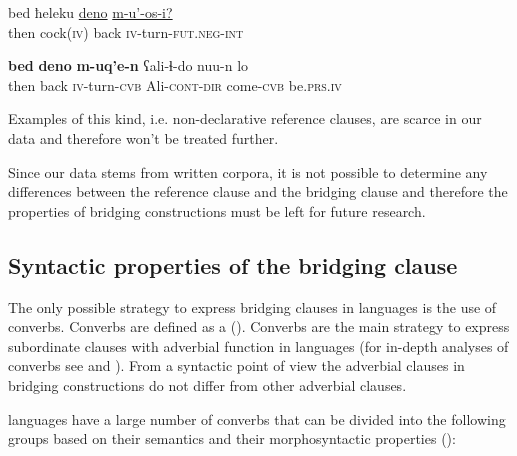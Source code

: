 \documentclass[output=paper]{LSP/langsci}
\begin{document}
\begin{exe}
	\ex	\label{ex:4ab}
	\begin{xlist}
		\ex	\label{ex:4a}
		\gll	 bed	ħeleku	\underline{deno}	\underline{m-u'-os-i?}\\
			then	cock(\textsc{iv})	back	\textsc{iv}-turn-\textsc{fut.neg-int}\\
		\glt	{}

		\ex	\label{ex:4b}
		\gll	\textbf{bed} 	\textbf{deno}		\textbf{m-uq'e-n}		ʕali-ɬ-do			nuu-n			lo\\
			then	back		\textsc{iv}-turn-\textsc{cvb}	Ali-\textsc{cont-dir}	come-\textsc{cvb}	be.\textsc{prs.iv}\\
		\glt	{}
	\end{xlist}
\end{exe}

Examples of this kind, i.e. non-declarative reference clauses, are scarce in our data and therefore won't be treated further. 

Since our data stems from written corpora, it is not possible to determine any  differences between the reference clause and the bridging clause and therefore the  properties of  bridging constructions must be left for future research.


\subsection{Syntactic properties of the bridging clause}
\label{ssec:Syntactic properties of the bridging clause}
The only possible strategy to express bridging clauses in  languages is the use of converbs. Converbs are defined as a  (\citealt[3]{Haspelmath.1995}). Converbs are the main strategy to express subordinate clauses with adverbial function in  languages (for in-depth analyses of converbs see \citealt{Comrie.Forker.Khalilova.2012} and \citealt{Forker.2013b}). From a syntactic point of view the adverbial clauses in bridging constructions do not differ from other adverbial clauses.

 languages have a large number of converbs that can be divided into the following groups based on their semantics and their morphosyntactic properties (\citealt{Comrie.Forker.Khalilova.2012}):
\end{document}
